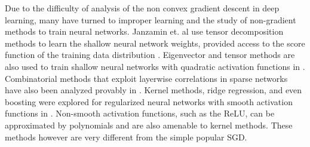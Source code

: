  

Due to the difficulty of analysis of the non convex gradient descent in deep learning, many have turned to improper learning and the study of non-gradient methods to train neural networks. Janzamin et. al use tensor decomposition methods to learn the shallow neural network weights, provided access to the score function of the training data distribution \cite{JanzaminSA15}. Eigenvector and tensor methods are also used to train shallow neural networks with quadratic activation functions in \cite{LivniSS14}. Combinatorial methods that exploit layerwise correlations in sparse networks have also been analyzed provably in \cite{AroraBGM13}. Kernel methods, ridge regression, and even boosting were explored for regularized neural networks with smooth activation functions in \cite{shalev2011learning, ZhangLWJ15, ZhangLJ15}. Non-smooth activation functions, such as the ReLU, can be approximated by polynomials and are also amenable to kernel methods\cite{GoelKKT16}. These methods however are very different from the simple popular SGD.


